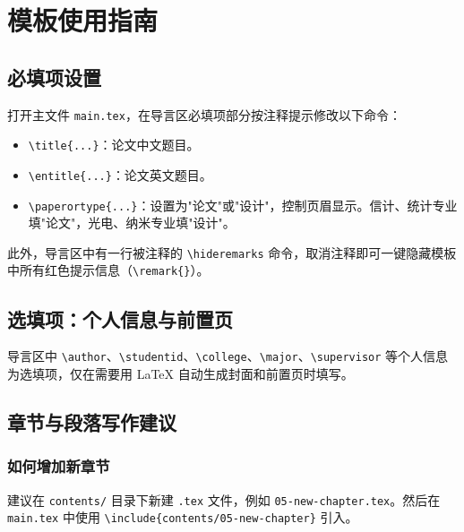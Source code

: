 \chapter{模板使用指南}

\section{必填项设置}
打开主文件 \texttt{main.tex}，在导言区必填项部分按注释提示修改以下命令：
\begin{itemize}
    \item \texttt{\textbackslash title\{...\}}：论文中文题目。
    \item \texttt{\textbackslash entitle\{...\}}：论文英文题目。
    \item \texttt{\textbackslash paperortype\{...\}}：设置为"论文"或"设计"，控制页眉显示。信计、统计专业填"论文"，光电、纳米专业填"设计"。
\end{itemize}

此外，导言区中有一行被注释的 \texttt{\textbackslash hideremarks} 命令，取消注释即可一键隐藏模板中所有红色提示信息（\texttt{\textbackslash remark\{\}}）。

\section{选填项：个人信息与前置页}
导言区中 \texttt{\textbackslash author}、\texttt{\textbackslash studentid}、\texttt{\textbackslash college}、\texttt{\textbackslash major}、\texttt{\textbackslash supervisor} 等个人信息为选填项，仅在需要用 \LaTeX{} 自动生成封面和前置页时填写。


\section{章节与段落写作建议}

\subsection{如何增加新章节}
建议在 \texttt{contents/} 目录下新建 \texttt{.tex} 文件，例如 \texttt{05-new-chapter.tex}。然后在 \texttt{main.tex} 中使用 \texttt{\textbackslash include\{contents/05-new-chapter\}} 引入。

